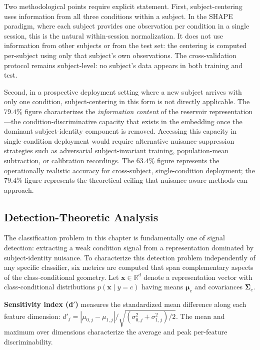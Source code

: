 Two methodological points require explicit statement. First, subject-centering uses information from all three conditions within a subject. In the SHAPE paradigm, where each subject provides one observation per condition in a single session, this is the natural within-session normalization. It does not use information from other subjects or from the test set: the centering is computed per-subject using only that subject's own observations. The cross-validation protocol remains subject-level: no subject's data appears in both training and test.

Second, in a prospective deployment setting where a new subject arrives with only one condition, subject-centering in this form is not directly applicable. The $79.4\%$ figure characterizes the \emph{information content} of the reservoir representation---the condition-discriminative capacity that exists in the embedding once the dominant subject-identity component is removed. Accessing this capacity in single-condition deployment would require alternative nuisance-suppression strategies such as adversarial subject-invariant training, population-mean subtraction, or calibration recordings. The $63.4\%$ figure represents the operationally realistic accuracy for cross-subject, single-condition deployment; the $79.4\%$ figure represents the theoretical ceiling that nuisance-aware methods can approach.

\subsection{Detection-Theoretic Analysis}

The classification problem in this chapter is fundamentally one of signal detection: extracting a weak condition signal from a representation dominated by subject-identity nuisance. To characterize this detection problem independently of any specific classifier, six metrics are computed that span complementary aspects of the class-conditional geometry. Let $\mathbf{x} \in \mathbb{R}^d$ denote a representation vector with class-conditional distributions $p(\mathbf{x} \mid y = c)$ having means $\boldsymbol{\mu}_c$ and covariances $\boldsymbol{\Sigma}_c$.

\textbf{Sensitivity index (d$'$)} measures the standardized mean difference along each feature dimension: $d'_j = |\mu_{0,j} - \mu_{1,j}| / \sqrt{(\sigma_{0,j}^2 + \sigma_{1,j}^2)/2}$. The mean and maximum over dimensions characterize the average and peak per-feature discriminability.

